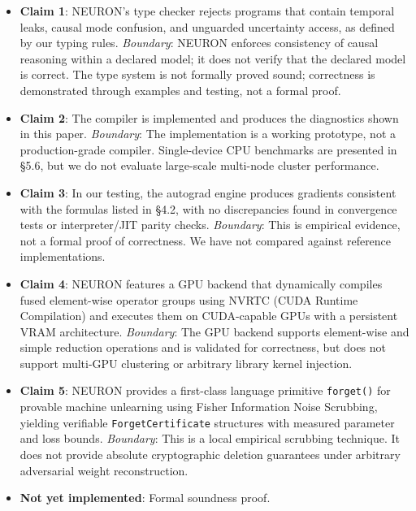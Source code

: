 \documentclass[11pt,a4paper]{article}
\begin{document}
\begin{itemize}[itemsep=2pt]
  \item \textbf{Claim 1}: NEURON's type checker rejects programs that contain temporal leaks, causal mode confusion, and unguarded uncertainty access, as defined by our typing rules. \emph{Boundary}: NEURON enforces consistency of causal reasoning within a declared model; it does not verify that the declared model is correct. The type system is not formally proved sound; correctness is demonstrated through examples and testing, not a formal proof.
  
  \item \textbf{Claim 2}: The compiler is implemented and produces the diagnostics shown in this paper. \emph{Boundary}: The implementation is a working prototype, not a production-grade compiler. Single-device CPU benchmarks are presented in \S5.6, but we do not evaluate large-scale multi-node cluster performance.
  
  \item \textbf{Claim 3}: In our testing, the autograd engine produces gradients consistent with the formulas listed in \S4.2, with no discrepancies found in convergence tests or interpreter/JIT parity checks. \emph{Boundary}: This is empirical evidence, not a formal proof of correctness. We have not compared against reference implementations.

  \item \textbf{Claim 4}: NEURON features a GPU backend that dynamically compiles fused element-wise operator groups using NVRTC (CUDA Runtime Compilation) and executes them on CUDA-capable GPUs with a persistent VRAM architecture. \emph{Boundary}: The GPU backend supports element-wise and simple reduction operations and is validated for correctness, but does not support multi-GPU clustering or arbitrary library kernel injection.
  
  \item \textbf{Claim 5}: NEURON provides a first-class language primitive \texttt{forget()} for provable machine unlearning using Fisher Information Noise Scrubbing, yielding verifiable \texttt{ForgetCertificate} structures with measured parameter and loss bounds. \emph{Boundary}: This is a local empirical scrubbing technique. It does not provide absolute cryptographic deletion guarantees under arbitrary adversarial weight reconstruction.
  
  \item \textbf{Not yet implemented}: Formal soundness proof.
\end{itemize}
\end{document}
